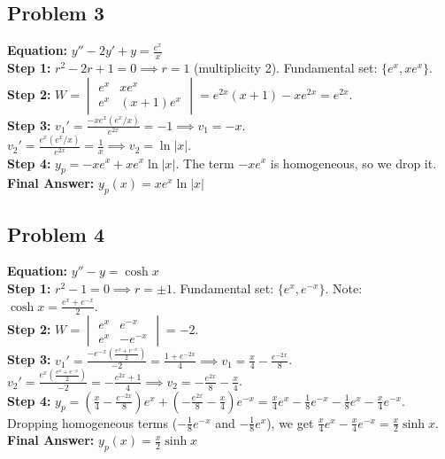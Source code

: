 \documentclass[11pt]{article}
\begin{document}
\subsection*{Problem 3}
\textbf{Equation:} $y'' - 2y' + y = \frac{e^x}{x}$ \\
\textbf{Step 1:} $r^2 - 2r + 1 = 0 \implies r = 1$ (multiplicity 2). Fundamental set: $\{e^x, xe^x\}$. \\
\textbf{Step 2:} $W = \begin{vmatrix} e^x & xe^x \\ e^x & (x+1)e^x \end{vmatrix} = e^{2x}(x+1) - xe^{2x} = e^{2x}$. \\
\textbf{Step 3:} $v_1' = \frac{-xe^x(e^x/x)}{e^{2x}} = -1 \implies v_1 = -x$. \\
$v_2' = \frac{e^x(e^x/x)}{e^{2x}} = \frac{1}{x} \implies v_2 = \ln|x|$. \\
\textbf{Step 4:} $y_p = -xe^x + xe^x\ln|x|$. The term $-xe^x$ is homogeneous, so we drop it. \\
\textbf{Final Answer:} $y_p(x) = xe^x\ln|x|$

\subsection*{Problem 4}
\textbf{Equation:} $y'' - y = \cosh x$ \\
\textbf{Step 1:} $r^2 - 1 = 0 \implies r = \pm 1$. Fundamental set: $\{e^x, e^{-x}\}$. Note: $\cosh x = \frac{e^x + e^{-x}}{2}$. \\
\textbf{Step 2:} $W = \begin{vmatrix} e^x & e^{-x} \\ e^x & -e^{-x} \end{vmatrix} = -2$. \\
\textbf{Step 3:} $v_1' = \frac{-e^{-x}(\frac{e^x + e^{-x}}{2})}{-2} = \frac{1 + e^{-2x}}{4} \implies v_1 = \frac{x}{4} - \frac{e^{-2x}}{8}$. \\
$v_2' = \frac{e^x(\frac{e^x + e^{-x}}{2})}{-2} = -\frac{e^{2x} + 1}{4} \implies v_2 = -\frac{e^{2x}}{8} - \frac{x}{4}$. \\
\textbf{Step 4:} $y_p = (\frac{x}{4} - \frac{e^{-2x}}{8})e^x + (-\frac{e^{2x}}{8} - \frac{x}{4})e^{-x} = \frac{x}{4}e^x - \frac{1}{8}e^{-x} - \frac{1}{8}e^x - \frac{x}{4}e^{-x}$. \\
Dropping homogeneous terms ($-\frac{1}{8}e^{-x}$ and $-\frac{1}{8}e^x$), we get $\frac{x}{4}e^x - \frac{x}{4}e^{-x} = \frac{x}{2}\sinh x$. \\
\textbf{Final Answer:} $y_p(x) = \frac{x}{2}\sinh x$
\end{document}

